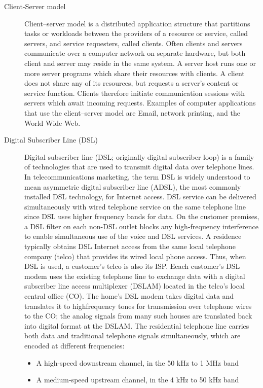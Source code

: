 \documentclass{article}
\begin{document}
\begin{description}
    \item[Client-Server model] Client–server model is a distributed application structure that partitions tasks or workloads between the providers of a resource or service, called servers, and service requesters, called clients. Often clients and servers communicate over a computer network on separate hardware, but both client and server may reside in the same system. A server host runs one or more server programs which share their resources with clients. A client does not share any of its resources, but requests a server's content or service function. Clients therefore initiate communication sessions with servers which await incoming requests. Examples of computer applications that use the client–server model are Email, network printing, and the World Wide Web.
    
    \item[Digital Subscriber Line (DSL)] Digital subscriber line (DSL; originally digital subscriber loop) is a family of technologies that are used to transmit digital data over telephone lines. In telecommunications marketing, the term DSL is widely understood to mean asymmetric digital subscriber line (ADSL), the most commonly installed DSL technology, for Internet access. DSL service can be delivered simultaneously with wired telephone service on the same telephone line since DSL uses higher frequency bands for data. On the customer premises, a DSL filter on each non-DSL outlet blocks any high-frequency interference to enable simultaneous use of the voice and DSL services. A residence typically obtains DSL Internet access
    from the same local telephone company (telco) that provides its wired local phone
    access. Thus, when DSL is used, a customer’s telco is also its ISP. Eeach customer’s DSL modem uses the existing telephone line to exchange data with a digital
    subscriber line access multiplexer (DSLAM) located in the telco’s local central
    office (CO). The home’s DSL modem takes digital data and translates it to highfrequency
    tones for transmission over telephone wires to the CO; the analog signals
    from many such houses are translated back into digital format at the DSLAM.
    The residential telephone line carries both data and traditional telephone signals
    simultaneously, which are encoded at different frequencies:
    \begin{itemize}
        \item A high-speed downstream channel, in the 50 kHz to 1 MHz band
        \item A medium-speed upstream channel, in the 4 kHz to 50 kHz band

\end{itemize}
\end{description}
\end{document}

